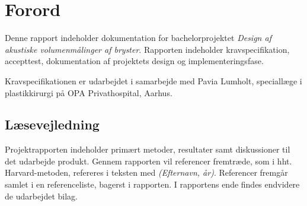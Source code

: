 \chapter*{Forord}

Denne rapport indeholder dokumentation for bachelorprojektet \textit{Design af akustiske volumenmålinger af bryster}. Rapporten indeholder kravspecifikation, accepttest, dokumentation af projektets design og implementeringsfase. 

Kravspecifikationen er udarbejdet i samarbejde med Pavia Lumholt, speciallæge i plastikkirurgi på OPA Privathospital, Aarhus. 

\vspace{2cm}


\begin{centering}
\begin{multicols}{2}

\columnbreak
{}

\end{multicols}
\end{centering}

\vspace{1cm}

\section*{Læsevejledning}
Projektrapporten indeholder primært metoder, resultater samt diskussioner til det udarbejde produkt. 
Gennem rapporten vil referencer fremtræde, som i hht. Harvard-metoden, refereres i teksten med \textit{(Efternavn, år)}. Referencer fremgår samlet i en referenceliste, bagerst i rapporten. I rapportens ende findes endvidere de udarbejdet bilag. 


